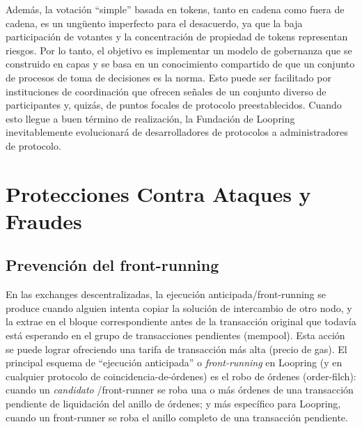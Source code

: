 \documentclass[UTF8,nofonts]{article}
\begin{document}
\begin{multicols}{2}
Adem\'as, la votaci\'on \enquote{simple} basada en tokens, tanto en cadena como fuera de cadena, es un ung\"uento imperfecto para el desacuerdo, ya que la baja participaci\'on de votantes y la concentraci\'on de propiedad de tokens representan riesgos. Por lo tanto, el objetivo es implementar un modelo de gobernanza que se construido en capas y se basa en un conocimiento compartido de que un conjunto de procesos de toma de decisiones es la norma. Esto puede ser facilitado por instituciones de coordinaci\'on que ofrecen se\~nales de un conjunto diverso de participantes y, quiz\'as, de puntos focales de protocolo preestablecidos. Cuando esto llegue a buen t\'ermino de realizaci\'on, la Fundaci\'on de Loopring inevitablemente evolucionar\'a de desarrolladores de protocolos a administradores de protocolo.



\section{Protecciones Contra Ataques y Fraudes}
\subsection{Prevenci\'on del front-running\label{sec:dual_authoring}}
En las exchanges descentralizadas, la ejecuci\'on anticipada/front-running se produce cuando alguien intenta copiar la soluci\'on de intercambio de otro nodo, y la extrae en el bloque correspondiente antes de la transacci\'on original que todav\'ia est\'a esperando en el grupo de transacciones pendientes (mempool). Esta acci\'on se puede lograr ofreciendo una tarifa de transacci\'on m\'as alta (precio de gas). El principal esquema de \enquote{ejecuci\'on anticipada} o \textit{front-running} en Loopring (y en cualquier protocolo de coincidencia-de-\'ordenes) es el robo de \'ordenes (order-filch): cuando un \textit{candidato} /front-runner se roba una o m\'as \'ordenes de una transacci\'on pendiente de liquidaci\'on del anillo de \'ordenes; y m\'as espec\'ifico para Loopring, cuando un front-runner se roba el anillo completo de una transacci\'on pendiente.


\end{multicols}
\end{document}
